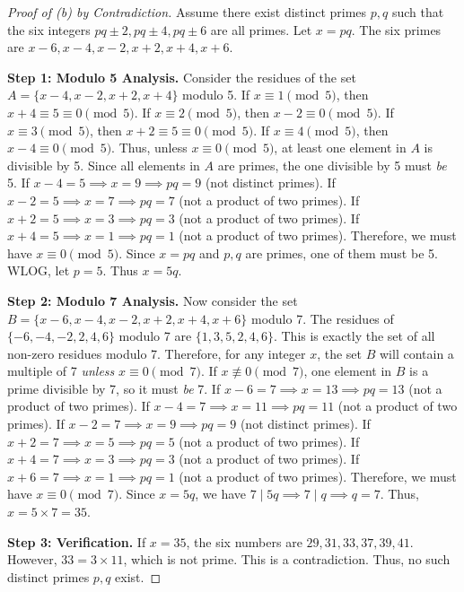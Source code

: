 \documentclass[11pt, a4paper]{article}
\theoremstyle{definition}
\theoremstyle{remark}
\begin{document}
\begin{proof}[Proof of (b) by Contradiction]
    Assume there exist distinct primes $p, q$ such that the six integers $pq \pm 2, pq \pm 4, pq \pm 6$ are all primes. Let $x = pq$. The six primes are $x-6, x-4, x-2, x+2, x+4, x+6$.
    
    \textbf{Step 1: Modulo 5 Analysis.}
    Consider the residues of the set $A = \{x-4, x-2, x+2, x+4\}$ modulo 5.
    If $x \equiv 1 \pmod 5$, then $x+4 \equiv 5 \equiv 0 \pmod 5$.
    If $x \equiv 2 \pmod 5$, then $x-2 \equiv 0 \pmod 5$.
    If $x \equiv 3 \pmod 5$, then $x+2 \equiv 5 \equiv 0 \pmod 5$.
    If $x \equiv 4 \pmod 5$, then $x-4 \equiv 0 \pmod 5$.
    Thus, unless $x \equiv 0 \pmod 5$, at least one element in $A$ is divisible by 5. Since all elements in $A$ are primes, the one divisible by 5 must \textit{be} 5.
    If $x-4=5 \implies x=9 \implies pq=9$ (not distinct primes).
    If $x-2=5 \implies x=7 \implies pq=7$ (not a product of two primes).
    If $x+2=5 \implies x=3 \implies pq=3$ (not a product of two primes).
    If $x+4=5 \implies x=1 \implies pq=1$ (not a product of two primes).
    Therefore, we must have $x \equiv 0 \pmod 5$. Since $x = pq$ and $p, q$ are primes, one of them must be 5. WLOG, let $p = 5$. Thus $x = 5q$.

    \textbf{Step 2: Modulo 7 Analysis.}
    Now consider the set $B = \{x-6, x-4, x-2, x+2, x+4, x+6\}$ modulo 7.
    The residues of $\{-6, -4, -2, 2, 4, 6\}$ modulo 7 are $\{1, 3, 5, 2, 4, 6\}$. This is exactly the set of all non-zero residues modulo 7.
    Therefore, for any integer $x$, the set $B$ will contain a multiple of 7 \textit{unless} $x \equiv 0 \pmod 7$.
    If $x \not\equiv 0 \pmod 7$, one element in $B$ is a prime divisible by 7, so it must \textit{be} 7.
    If $x-6=7 \implies x=13 \implies pq=13$ (not a product of two primes).
    If $x-4=7 \implies x=11 \implies pq=11$ (not a product of two primes).
    If $x-2=7 \implies x=9 \implies pq=9$ (not distinct primes).
    If $x+2=7 \implies x=5 \implies pq=5$ (not a product of two primes).
    If $x+4=7 \implies x=3 \implies pq=3$ (not a product of two primes).
    If $x+6=7 \implies x=1 \implies pq=1$ (not a product of two primes).
    Therefore, we must have $x \equiv 0 \pmod 7$. 
    Since $x = 5q$, we have $7 \mid 5q \implies 7 \mid q \implies q = 7$.
    Thus, $x = 5 \times 7 = 35$.
    
    \textbf{Step 3: Verification.}
    If $x = 35$, the six numbers are $29, 31, 33, 37, 39, 41$.
    However, $33 = 3 \times 11$, which is not prime. This is a contradiction.
    Thus, no such distinct primes $p, q$ exist.
\end{proof}
\end{document}
